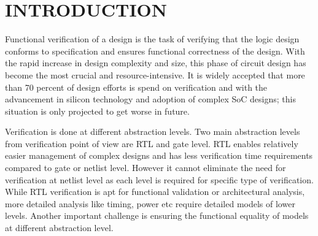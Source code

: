 \chapter{INTRODUCTION}

Functional verification of a design is the task of verifying that the logic design conforms to specification and ensures functional correctness of the design.  With the rapid increase in design complexity and size, this phase of circuit design has become the most crucial and resource-intensive. It is widely accepted that more than 70 percent of design efforts is spend on verification and with the advancement in silicon technology and adoption of complex SoC designs; this situation is only projected to get worse in future\cite{phd:zhang}. 

Verification is done at different abstraction levels. Two main abstraction levels from verification point of view are RTL and gate level\cite{phd:zhang}. RTL enables relatively easier management of complex designs and has less verification time requirements compared to gate or netlist level. However it cannot eliminate the need for verification at netlist level as each level is required for specific type of verification. While RTL verification is apt for functional validation or architectural analysis, more detailed analysis like timing, power etc require detailed models of lower levels. Another important challenge is ensuring the functional equality of models at different abstraction level.  

